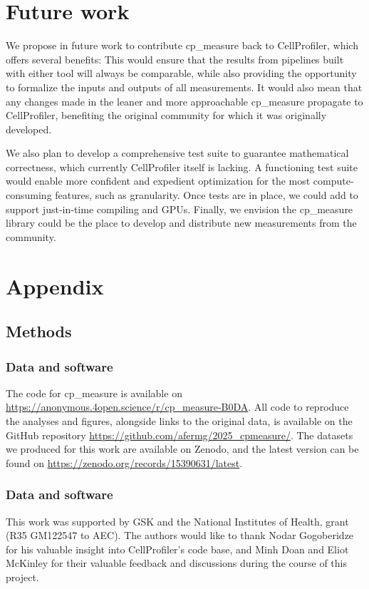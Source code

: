 \documentclass{article}
\begin{document}
\section{Future work}
\label{sec:org5cdbb12}
We propose in future work to contribute cp\_measure back to CellProfiler, which offers several benefits: This would ensure that the results from pipelines built with either tool will always be comparable, while also providing the opportunity to formalize the inputs and outputs of all measurements. It would also mean that any changes made in the leaner and more approachable cp\_measure propagate to CellProfiler, benefiting the original community for which it was originally developed.

We also plan to develop a comprehensive test suite to guarantee mathematical correctness, which currently CellProfiler itself is lacking. A functioning test suite would enable more confident and expedient optimization for the most compute-consuming features, such as granularity. Once tests are in place, we could add to support just-in-time compiling and GPUs. Finally, we envision the cp\_measure library could be the place to develop and distribute new measurements from the community. 



\section{Appendix}
\label{sec:orgdd18dd8}
\subsection{Methods}
\label{sec:orgb3e9382}
\subsubsection{Data and software}
\label{sec:orgbda0ae2}
The code for cp\_measure is available on \url{https://anonymous.4open.science/r/cp\_measure-B0DA}. All code to reproduce the analyses and figures, alongside links to the original data, is available on the GitHub repository \url{https://github.com/afermg/2025\_cpmeasure/}. The datasets we produced for this work are available on Zenodo, and the latest version can be found on \url{https://zenodo.org/records/15390631/latest}.
\subsubsection{Data and software}
\label{sec:acknowledgements}

This work was supported by GSK and the National Institutes of Health, grant (R35 GM122547 to AEC). The authors would like to thank Nodar Gogoberidze for his valuable insight into CellProfiler's code base, and Minh Doan and Eliot McKinley for their valuable feedback and discussions during the course of this project.
\end{document}
